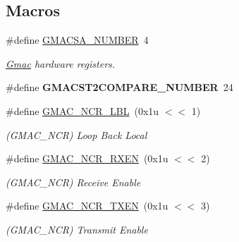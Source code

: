 \subsection*{Macros}
\begin{DoxyCompactItemize}
\item 
\mbox{\label{group__SAMV71__GMAC_gaa647e0e4433f73db7438443c6d90aadb}} 
\#define \mbox{\hyperlink{group__SAMV71__GMAC_gaa647e0e4433f73db7438443c6d90aadb}{G\+M\+A\+C\+S\+A\+\_\+\+N\+U\+M\+B\+ER}}~4
\begin{DoxyCompactList}\small\item\em \mbox{\hyperlink{structGmac}{Gmac}} hardware registers. \end{DoxyCompactList}\item 
\mbox{\label{group__SAMV71__GMAC_gaecc0163d037f0e089dbb037719862bc2}} 
\#define {\bfseries G\+M\+A\+C\+S\+T2\+C\+O\+M\+P\+A\+R\+E\+\_\+\+N\+U\+M\+B\+ER}~24
\item 
\mbox{\label{group__SAMV71__GMAC_ga755eb1962a4bfcf8785af7ffda9a10de}} 
\#define \mbox{\hyperlink{group__SAMV71__GMAC_ga755eb1962a4bfcf8785af7ffda9a10de}{G\+M\+A\+C\+\_\+\+N\+C\+R\+\_\+\+L\+BL}}~(0x1u $<$$<$ 1)
\begin{DoxyCompactList}\small\item\em (G\+M\+A\+C\+\_\+\+N\+CR) Loop Back Local \end{DoxyCompactList}\item 
\mbox{\label{group__SAMV71__GMAC_gacb35b345b04d2c77ef252c03146794a3}} 
\#define \mbox{\hyperlink{group__SAMV71__GMAC_gacb35b345b04d2c77ef252c03146794a3}{G\+M\+A\+C\+\_\+\+N\+C\+R\+\_\+\+R\+X\+EN}}~(0x1u $<$$<$ 2)
\begin{DoxyCompactList}\small\item\em (G\+M\+A\+C\+\_\+\+N\+CR) Receive Enable \end{DoxyCompactList}\item 
\mbox{\label{group__SAMV71__GMAC_ga69039c870c224c221b1c6b2f70aab80d}} 
\#define \mbox{\hyperlink{group__SAMV71__GMAC_ga69039c870c224c221b1c6b2f70aab80d}{G\+M\+A\+C\+\_\+\+N\+C\+R\+\_\+\+T\+X\+EN}}~(0x1u $<$$<$ 3)
\begin{DoxyCompactList}\small\item\em (G\+M\+A\+C\+\_\+\+N\+CR) Transmit Enable \end{DoxyCompactList}\item 
$$
\end{DoxyCompactItemize}
